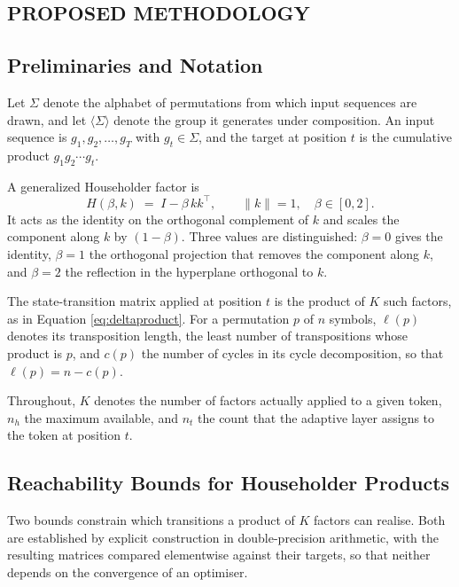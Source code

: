 \begin{center}
	\chapter{PROPOSED METHODOLOGY}
\end{center}
\justifying

\section{Preliminaries and Notation}

Let $\Sigma$ denote the alphabet of permutations from which input sequences are
drawn, and let $\langle \Sigma \rangle$ denote the group it generates under
composition. An input sequence is $g_1, g_2, \dots, g_T$ with $g_t \in \Sigma$,
and the target at position $t$ is the cumulative product
$g_1 g_2 \cdots g_t$.

A generalized Householder factor is
\begin{equation}
H(\beta, k) \;=\; I - \beta\, k k^{\!\top},
\qquad \lVert k \rVert = 1, \quad \beta \in [0, 2].
\end{equation}
It acts as the identity on the orthogonal complement of $k$ and scales the
component along $k$ by $(1 - \beta)$. Three values are distinguished:
$\beta = 0$ gives the identity, $\beta = 1$ the orthogonal projection that
removes the component along $k$, and $\beta = 2$ the reflection in the hyperplane
orthogonal to $k$.

The state-transition matrix applied at position $t$ is the product of $K$ such
factors, as in Equation \ref{eq:deltaproduct}. For a permutation $p$ of $n$
symbols, $\ell(p)$ denotes its transposition length, the least number of
transpositions whose product is $p$, and $c(p)$ the number of cycles in its cycle
decomposition, so that $\ell(p) = n - c(p)$.

Throughout, $K$ denotes the number of factors actually applied to a given token,
$n_h$ the maximum available, and $n_t$ the count that the adaptive layer assigns
to the token at position $t$.

\section{Reachability Bounds for Householder Products}

Two bounds constrain which transitions a product of $K$ factors can realise. Both
are established by explicit construction in double-precision arithmetic, with the
resulting matrices compared elementwise against their targets, so that neither
depends on the convergence of an optimiser.

